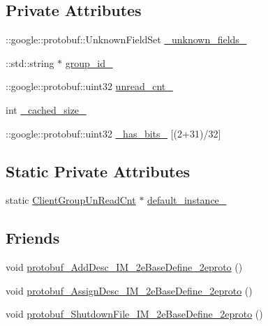 \subsection*{Private Attributes}
\begin{DoxyCompactItemize}
\item 
\+::google\+::protobuf\+::\+Unknown\+Field\+Set \hyperlink{class_i_m_1_1_base_define_1_1_client_group_un_read_cnt_a368277d87c78caaf18dc88fb3d4bd93d}{\+\_\+unknown\+\_\+fields\+\_\+}
\item 
\+::std\+::string $\ast$ \hyperlink{class_i_m_1_1_base_define_1_1_client_group_un_read_cnt_a6bf5bae50d9e9010c2369b263d42909a}{group\+\_\+id\+\_\+}
\item 
\+::google\+::protobuf\+::uint32 \hyperlink{class_i_m_1_1_base_define_1_1_client_group_un_read_cnt_a6b366050e78199d76be4445c5ca3a397}{unread\+\_\+cnt\+\_\+}
\item 
int \hyperlink{class_i_m_1_1_base_define_1_1_client_group_un_read_cnt_ab52be931fbdb0e6262afe3e725ef1fde}{\+\_\+cached\+\_\+size\+\_\+}
\item 
\+::google\+::protobuf\+::uint32 \hyperlink{class_i_m_1_1_base_define_1_1_client_group_un_read_cnt_a197b87ef4af5019236923d2ffb472da1}{\+\_\+has\+\_\+bits\+\_\+} \mbox{[}(2+31)/32\mbox{]}
\end{DoxyCompactItemize}
\subsection*{Static Private Attributes}
\begin{DoxyCompactItemize}
\item 
static \hyperlink{class_i_m_1_1_base_define_1_1_client_group_un_read_cnt}{Client\+Group\+Un\+Read\+Cnt} $\ast$ \hyperlink{class_i_m_1_1_base_define_1_1_client_group_un_read_cnt_a8bbf1890999ec4f53463377864a68888}{default\+\_\+instance\+\_\+}
\end{DoxyCompactItemize}
\subsection*{Friends}
\begin{DoxyCompactItemize}
\item 
void \hyperlink{class_i_m_1_1_base_define_1_1_client_group_un_read_cnt_a9e69e602ccebaa03e642ca43da69b2eb}{protobuf\+\_\+\+Add\+Desc\+\_\+\+I\+M\+\_\+2e\+Base\+Define\+\_\+2eproto} ()
\item 
void \hyperlink{class_i_m_1_1_base_define_1_1_client_group_un_read_cnt_a2c5118df3e7622ff896b422106a76fef}{protobuf\+\_\+\+Assign\+Desc\+\_\+\+I\+M\+\_\+2e\+Base\+Define\+\_\+2eproto} ()
\item 
void \hyperlink{class_i_m_1_1_base_define_1_1_client_group_un_read_cnt_aa7f5f65378aed5daf4141184fe892bcf}{protobuf\+\_\+\+Shutdown\+File\+\_\+\+I\+M\+\_\+2e\+Base\+Define\+\_\+2eproto} ()
\end{DoxyCompactItemize}


